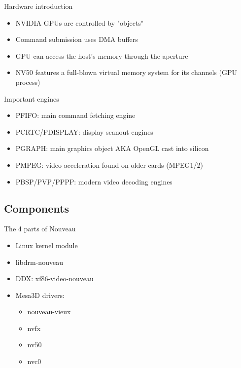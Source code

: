 \documentclass[11pt,english,compress]{beamer}
\begin{document}
		\begin{frame}
			\begin{block}{Hardware introduction}
				\begin{itemize}
					\item NVIDIA GPUs are controlled by "objects"
					\item Command submission uses DMA buffers
					\item GPU can access the host's memory through the aperture
					\item NV50 features a full-blown virtual memory system for its channels (GPU process)
				\end{itemize}
			\end{block}
			\begin{block}{Important engines}
				\begin{itemize}
					\item PFIFO: main command fetching engine
					\item PCRTC/PDISPLAY: display scanout engines
					\item PGRAPH: main graphics object AKA OpenGL cast into silicon
					\item PMPEG: video acceleration found on older cards (MPEG1/2)
					\item PBSP/PVP/PPPP: modern video decoding engines %
				\end{itemize}
			\end{block}
		\end{frame}

	\subsection{Components}
		\begin{frame}
			\begin{block}{The 4 parts of Nouveau}
				\begin{itemize}
					\item Linux kernel module
					\item libdrm-nouveau
					\item DDX: xf86-video-nouveau
					\item Mesa3D drivers:
						\begin{itemize}
							\item nouveau-vieux
							\item nvfx
							\item nv50
							\item nvc0
						\end{itemize}
				\end{itemize}
			\end{block}
		\end{frame}
\end{document}
